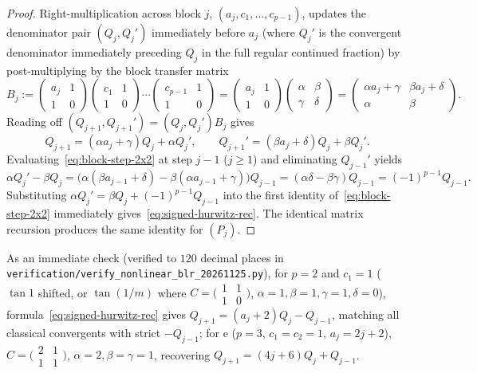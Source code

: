\documentclass[11pt]{article}
\theoremstyle{definition}
\theoremstyle{remark}
\newcommand{\ee}{\mathrm{e}}
\begin{document}
\begin{proof}
Right-multiplication across block $j$, $(a_j,c_1,\dots,c_{p-1})$, updates the
denominator pair $(Q_j,Q_j')$ immediately before $a_j$ (where $Q_j'$ is the
convergent denominator immediately preceding $Q_j$ in the full regular
continued fraction) by post-multiplying by the block transfer matrix
\[
B_j:=\begin{pmatrix}a_j&1\\1&0\end{pmatrix}
\begin{pmatrix}c_1&1\\1&0\end{pmatrix}\cdots\begin{pmatrix}c_{p-1}&1\\1&0\end{pmatrix}
=\begin{pmatrix}a_j&1\\1&0\end{pmatrix}\begin{pmatrix}\alpha&\beta\\\gamma&\delta\end{pmatrix}
=\begin{pmatrix}\alpha a_j+\gamma&\beta a_j+\delta\\ \alpha&\beta\end{pmatrix}.
\]
Reading off $(Q_{j+1},Q_{j+1}')=(Q_j,Q_j')B_j$ gives
\begin{equation}\label{eq:block-step-2x2}
Q_{j+1}=(\alpha a_j+\gamma)Q_j+\alpha Q_j',\qquad
Q_{j+1}'=(\beta a_j+\delta)Q_j+\beta Q_j'.
\end{equation}
Evaluating~\eqref{eq:block-step-2x2} at step $j-1$ ($j\ge 1$) and eliminating
$Q_{j-1}'$ yields
\[
\alpha Q_j'-\beta Q_j
=\bigl(\alpha(\beta a_{j-1}+\delta)-\beta(\alpha a_{j-1}+\gamma)\bigr)Q_{j-1}
=(\alpha\delta-\beta\gamma)Q_{j-1}=(-1)^{p-1}Q_{j-1}.
\]
Substituting $\alpha Q_j'=\beta Q_j+(-1)^{p-1}Q_{j-1}$ into the first identity
of~\eqref{eq:block-step-2x2} immediately gives~\eqref{eq:signed-hurwitz-rec}. The
identical matrix recursion produces the same identity for $(P_j)$.
\end{proof}

As an immediate check (verified to $120$ decimal places in
\texttt{verification/\allowbreak verify\_\allowbreak nonlinear\_\allowbreak blr\_\allowbreak 20261125.py}),
for $p=2$ and $c_1=1$ ($\tan 1$ shifted, or $\tan(1/m)$ where $C=\bigl(\begin{smallmatrix}1&1\\1&0\end{smallmatrix}\bigr)$,
$\alpha=1,\beta=1,\gamma=1,\delta=0$), formula~\eqref{eq:signed-hurwitz-rec} gives
$Q_{j+1}=(a_j+2)Q_j-Q_{j-1}$, matching all classical convergents with strict
$-Q_{j-1}$; for $\ee$ ($p=3$, $c_1=c_2=1$, $a_j=2j+2$), $C=\bigl(\begin{smallmatrix}2&1\\1&1\end{smallmatrix}\bigr)$,
$\alpha=2,\beta=\gamma=1$, recovering $Q_{j+1}=(4j+6)Q_j+Q_{j-1}$.
\end{document}
